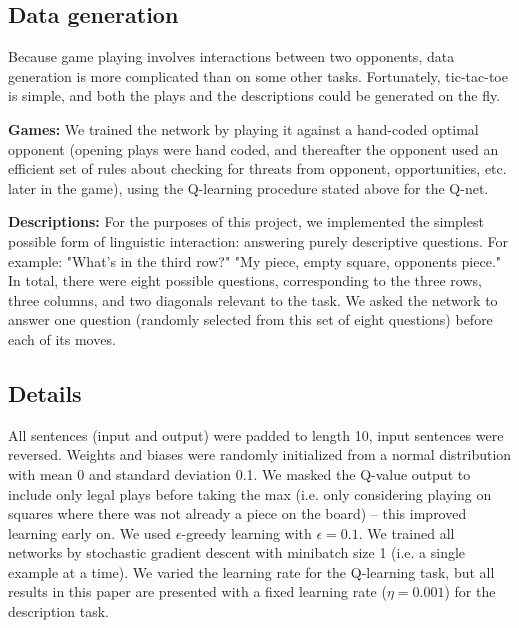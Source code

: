 \documentclass{article} %
\begin{document}
\subsection{Data generation}
Because game playing involves interactions between two opponents, data generation is more complicated than on some other tasks. Fortunately, tic-tac-toe is simple, and both the plays and the descriptions could be generated on the fly. \par 
\textbf{Games:} We trained the network by playing it against a hand-coded optimal opponent (opening plays were hand coded, and thereafter the opponent used an efficient set of rules about checking for threats from opponent, opportunities, etc. later in the game), using the Q-learning procedure stated above for the Q-net. \par
\textbf{Descriptions:} For the purposes of this project, we implemented the simplest possible form of linguistic interaction: answering purely descriptive questions. For example: "What's in the third row?" "My piece, empty square, opponents piece." In total, there were eight possible questions, corresponding to the three rows, three columns, and two diagonals relevant to the task. We asked the network to answer one question (randomly selected from this set of eight questions) before each of its moves. \par
\subsection{Details}
All sentences (input and output) were padded to length 10, input sentences were reversed. Weights and biases were randomly initialized from a normal distribution with mean 0 and standard deviation 0.1. We masked the Q-value output to include only legal plays before taking the max (i.e. only considering playing on squares where there was not already a piece on the board) -- this improved learning early on. We used \(\epsilon\)-greedy learning with \(\epsilon = 0.1\). We trained all networks by stochastic gradient descent with minibatch size 1 (i.e. a single example at a time). We varied the learning rate for the Q-learning task, but all results in this paper are presented with a fixed learning rate (\(\eta = 0.001\)) for the description task. 
\end{document}
